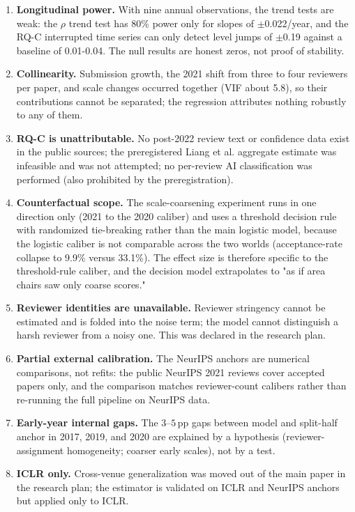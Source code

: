 \documentclass[10pt]{article}
\begin{document}
\begin{enumerate}
\item \textbf{Longitudinal power.} With nine annual observations, the trend tests are weak: the $\rho$ trend test has 80\% power only for slopes of $\pm$0.022/year, and the RQ-C interrupted time series can only detect level jumps of $\pm$0.19 against a baseline of 0.01-0.04. The null results are honest zeros, not proof of stability.
\item \textbf{Collinearity.} Submission growth, the 2021 shift from three to four reviewers per paper, and scale changes occurred together (VIF about 5.8), so their contributions cannot be separated; the regression attributes nothing robustly to any of them.
\item \textbf{RQ-C is unattributable.} No post-2022 review text or confidence data exist in the public sources; the preregistered Liang et al. aggregate estimate was infeasible and was not attempted; no per-review AI classification was performed (also prohibited by the preregistration).
\item \textbf{Counterfactual scope.} The scale-coarsening experiment runs in one direction only (2021 to the 2020 caliber) and uses a threshold decision rule with randomized tie-breaking rather than the main logistic model, because the logistic caliber is not comparable across the two worlds (acceptance-rate collapse to 9.9\% versus 33.1\%). The effect size is therefore specific to the threshold-rule caliber, and the decision model extrapolates to "as if area chairs saw only coarse scores."
\item \textbf{Reviewer identities are unavailable.} Reviewer stringency cannot be estimated and is folded into the noise term; the model cannot distinguish a harsh reviewer from a noisy one. This was declared in the research plan.
\item \textbf{Partial external calibration.} The NeurIPS anchors are numerical comparisons, not refits: the public NeurIPS 2021 reviews cover accepted papers only, and the comparison matches reviewer-count calibers rather than re-running the full pipeline on NeurIPS data.
\item \textbf{Early-year internal gaps.} The $3$--$5$\,pp gaps between model and split-half anchor in 2017, 2019, and 2020 are explained by a hypothesis (reviewer-assignment homogeneity; coarser early scales), not by a test.
\item \textbf{ICLR only.} Cross-venue generalization was moved out of the main paper in the research plan; the estimator is validated on ICLR and NeurIPS anchors but applied only to ICLR.
\end{enumerate}
\end{document}
